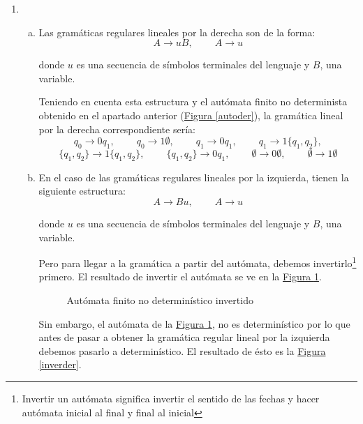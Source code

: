 \documentclass[10pt,a4paper,spanish]{report}
\begin{document}
\begin{enumerate}[1.]
\newpage
\item ~
\begin{enumerate}[a)]
\item Las gramáticas regulares lineales por la derecha son de la forma:
\begin{displaymath}
A \rightarrow uB, \qquad\ A \rightarrow u
\end{displaymath}

donde $u$ es una secuencia de símbolos terminales del lenguaje y $B$, una variable.

Teniendo en cuenta esta estructura y el autómata finito no determinista obtenido en el apartado anterior (\hyperref[autoder]{Figura \ref*{autoder}}), la gramática lineal por la derecha correspondiente sería:
\begin{displaymath}
q_0 \rightarrow 0q_1, \qquad\ q_0 \rightarrow 1\emptyset, \qquad\ q_1 \rightarrow 0q_1, \qquad\ q_1 \rightarrow 1\{q_1,q_2\},
\end{displaymath}
\begin{displaymath}
\{q_1,q_2\} \rightarrow 1\{q_1,q_2\}, \qquad\ \{q_1,q_2\} \rightarrow 0q_1, \qquad\ \emptyset \rightarrow 0\emptyset, \qquad\ \emptyset \rightarrow 1\emptyset
\end{displaymath}

\item En el caso de las gramáticas regulares lineales por la izquierda, tienen la siguiente estructura:
\begin{displaymath}
A \rightarrow Bu, \qquad\ A \rightarrow u
\end{displaymath}

donde $u$ es una secuencia de símbolos terminales del lenguaje y $B$, una variable.

Pero para llegar a la gramática a partir del autómata, debemos invertirlo\footnote{Invertir un autómata significa invertir el sentido de las fechas y hacer autómata inicial al final y final al inicial} primero. El resultado de invertir el autómata se ve en la \hyperref[invertido]{Figura \ref*{invertido}}. 

\begin{figure}[!h]
\centering

\caption{Autómata finito no determinístico invertido}
\label{invertido}
\end{figure}

Sin embargo, el autómata de la \hyperref[invertido]{Figura \ref*{invertido}}, no es determinístico por lo que antes de pasar a obtener la gramática regular lineal por la izquierda debemos pasarlo a determinístico. El resultado de ésto es la \hyperref[inverder]{Figura \ref*{inverder}}.


\end{enumerate}
\end{enumerate}
\end{document}
